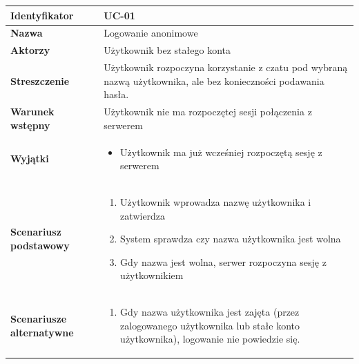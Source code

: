 \documentclass[11pt,oneside,a4paper,titlepage,onecolumn]{article}
\newenvironment{enumreq}
{ \begin{enumerate}[topsep=0pt,itemsep=-1ex,partopsep=1ex,parsep=1ex] }
{ \end{enumerate}                  }
\begin{document}
{\footnotesize

\vspace{2em}

\begin{tabular}{ | l | l | }
	\hline
		\textbf{Identyfikator} & 
		UC-01
		\\
		
	\hline
		\textbf{Nazwa} & 
		Logowanie anonimowe
		\\
		
	\hline
		\textbf{Aktorzy} & \parbox[t]{11cm}{
			Użytkownik bez stałego konta
		}\\
		 
	\hline
		\parbox[t]{4cm}{\textbf{Streszczenie}} & \parbox[t]{11cm}{
			Użytkownik rozpoczyna korzystanie z czatu pod wybraną nazwą
			użytkownika, ale bez konieczności podawania hasła.
			
		}\\
		
	\hline
		\parbox[t]{4cm}{\textbf{Warunek wstępny}} & \parbox[t]{11cm}{
			Użytkownik nie ma rozpoczętej sesji połączenia z serwerem
		}
		\\
		
	\hline
		\parbox[t]{4cm}{\textbf{Wyjątki}} & \parbox[t]{11cm}{
			\begin{itemize}
				\item Użytkownik ma już wcześniej rozpoczętą
				 sesję z serwerem
			\end{itemize}
			
		}
		\\

	\hline
		\parbox[t]{4cm}{\textbf{Scenariusz podstawowy}} & \parbox[t]{11cm}{
			\begin{enumreq}
				\item Użytkownik wprowadza nazwę użytkownika i zatwierdza
				\item System sprawdza czy nazwa użytkownika jest wolna
				\item Gdy nazwa jest wolna, serwer rozpoczyna sesję
				z użytkownikiem
			\end{enumreq}
		}
		\\
		
	\hline
		\parbox[t]{4cm}{\textbf{Scenariusze alternatywne}} & \parbox[t]
		{11cm}{
			\begin{enumreq}
				\item Gdy nazwa użytkownika jest zajęta (przez zalogowanego
				użytkownika lub stałe konto użytkownika), logowanie nie
				powiedzie się.
			\end{enumreq}
		}
		\\
		

\end{tabular}}
\end{document}
